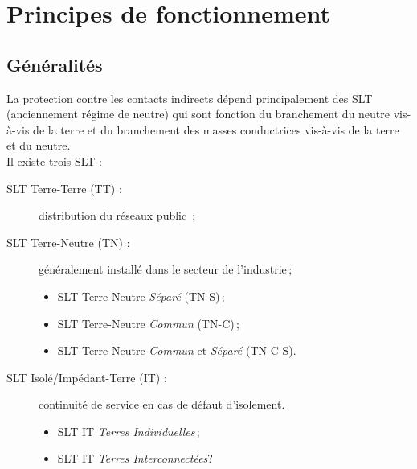 

\begin{comment}

\documentclass[a4paper, 11pt, twoside, fleqn]{memoir}

\usepackage{AOCDTF}

\marqueurchapitre %


	\openleft %

\end{comment}

\chapter{Principes de fonctionnement}
\ChapFrame
 
\section{Généralités}

La protection contre les contacts indirects dépend principalement des SLT (anciennement régime de neutre) qui sont fonction du branchement du neutre vis-à-vis de la terre et du branchement des masses conductrices vis-à-vis de la terre et du neutre.\\
Il existe trois SLT :
\begin{description}
\item[SLT Terre-Terre (TT) :] distribution du réseaux public \,;
\item[SLT Terre-Neutre (TN) :] généralement installé dans le secteur de l'industrie\,;
\begin{itemize}
\item SLT Terre-Neutre \emph{Séparé} (TN-S)\,;
\item SLT Terre-Neutre \emph{Commun} (TN-C)\,;
\item SLT Terre-Neutre \emph{Commun} et \emph{Séparé} (TN-C-S).
\end{itemize}
\item[SLT Isolé/Impédant-Terre (IT) :] continuité de service en cas de défaut d'isolement.
\begin{itemize}
\item SLT IT \emph{Terres Individuelles}\,;
\item SLT IT \emph{Terres Interconnectées}?
\end{itemize}
\end{description}

